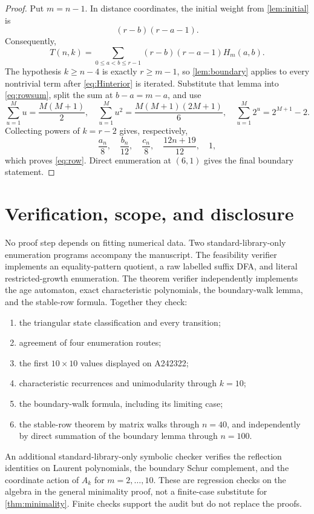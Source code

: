 \documentclass[11pt]{article}
\theoremstyle{remark}
\begin{document}
\begin{proof}
Put $m=n-1$.  In distance coordinates, the initial weight from
\cref{lem:initial} is
\[
 (r-b)(r-a-1).
\]
Consequently,
\begin{equation}\label{eq:rowsum}
 T(n,k)=\sum_{0\leq a<b\leq r-1}
 (r-b)(r-a-1)H_m(a,b).
\end{equation}
The hypothesis $k\geq n-4$ is exactly $r\geq m-1$, so
\cref{lem:boundary} applies to every nontrivial term after
\eqref{eq:Hinterior} is iterated.  Substitute that lemma into
\eqref{eq:rowsum}, split the sum at $b-a=m-a$, and use
\[
 \sum_{u=1}^{M}u=\frac{M(M+1)}2,\quad
 \sum_{u=1}^{M}u^2=\frac{M(M+1)(2M+1)}6,\quad
 \sum_{u=1}^{M}2^u=2^{M+1}-2.
\]
Collecting powers of $k=r-2$ gives, respectively,
\[
 \frac{a_n}{8},\quad\frac{b_n}{12},\quad
 \frac{c_n}{8},\quad\frac{12n+19}{12},\quad1,
\]
which proves \eqref{eq:row}.  Direct enumeration at $(6,1)$ gives the final
boundary statement.
\end{proof}

\section{Verification, scope, and disclosure}

No proof step depends on fitting numerical data.  Two standard-library-only
enumeration programs accompany the manuscript.  The feasibility verifier implements an
equality-pattern quotient, a raw labelled suffix DFA, and literal
restricted-growth enumeration.  The theorem verifier independently implements
the age automaton, exact characteristic polynomials, the boundary-walk lemma,
and the stable-row formula.  Together they check:
\begin{enumerate}
\item the triangular state classification and every transition;
\item agreement of four enumeration routes;
\item the first $10\times10$ values displayed on A242322;
\item characteristic recurrences and unimodularity through $k=10$;
\item the boundary-walk formula, including its limiting case;
\item the stable-row theorem by matrix walks through $n=40$, and independently
      by direct summation of the boundary lemma through $n=100$.
\end{enumerate}
An additional standard-library-only symbolic checker verifies the reflection
identities on Laurent polynomials, the boundary Schur complement, and the
coordinate action of $A_k$ for $m=2,\ldots,10$.  These are regression checks
on the algebra in the general minimality proof, not a finite-case substitute
for \cref{thm:minimality}.
Finite checks support the audit but do not replace the proofs.
\end{document}
